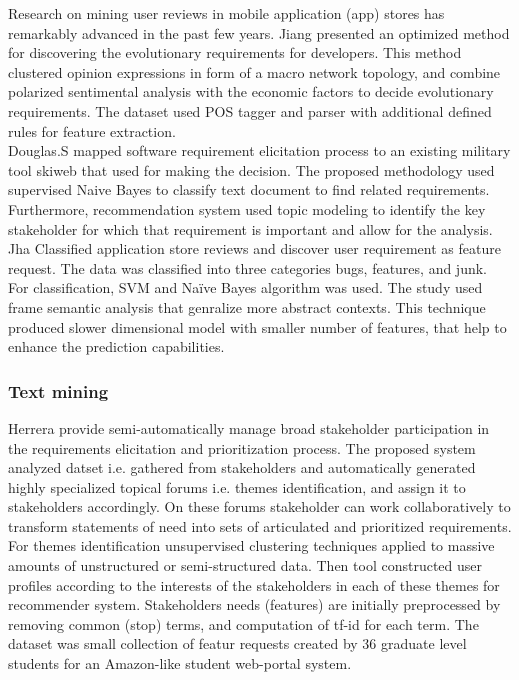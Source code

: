 Research on mining user reviews in mobile application (app) stores has
remarkably advanced in the past few years. Jiang \etal \cite{Jiang:2014}
presented an optimized method for discovering the evolutionary requirements for
developers. This method clustered opinion expressions in form of a macro network
topology, and combine polarized sentimental analysis with the economic factors
to decide evolutionary requirements. The dataset used POS tagger and parser with
additional defined rules for feature extraction.\\

	 Douglas.S \etal\cite{Douglas:S2008} mapped software requirement elicitation process to an
existing military tool skiweb that used for making the decision. The proposed
methodology used supervised Naive Bayes to classify text document to find
related requirements. Furthermore, recommendation system used topic modeling to
identify the key stakeholder for which that requirement is important and allow
for the analysis.\\

	 Jha \etal \cite{Jha:2017} Classified application store reviews
and discover user requirement as feature request. The data was classified into
three categories bugs, features, and junk. For classification, SVM and Naïve
Bayes algorithm was used. The study used frame semantic analysis that genralize
more abstract contexts. This technique produced slower dimensional model with
smaller number of features, that help to enhance the prediction
capabilities.\\


\subsubsection{Text mining}

 
 	Herrera \etal \cite{Castro-Herrera:2009} provide semi-automatically manage broad stakeholder participation in the requirements elicitation and prioritization process. 
The proposed system analyzed datset i.e. gathered from stakeholders and automatically generated highly specialized topical forums i.e. themes identification, and assign it to stakeholders accordingly.
On these forums stakeholder can work collaboratively to transform statements of need into sets of articulated and prioritized requirements. For themes identification unsupervised clustering
techniques applied to massive amounts of unstructured or semi-structured data. Then tool constructed user profiles according to the interests
of the stakeholders in each of these themes for recommender system. Stakeholders
needs (features) are initially preprocessed by removing common (stop) terms, and
computation of tf-id for each term. The dataset was  small collection of featur requests created by 36 graduate level students for an Amazon-like student web-portal system.\\

